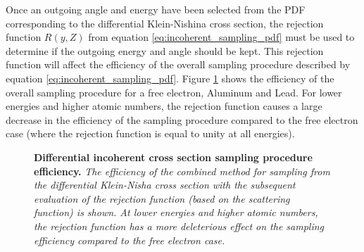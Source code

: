 Once an outgoing angle and energy have been selected from the PDF corresponding
to the differential Klein-Nishina cross section, the rejection function 
$R(y,Z)$ from equation \ref{eq:incoherent_sampling_pdf} must be used to 
determine if the outgoing energy and angle should be kept. This rejection 
function will affect the efficiency of the overall sampling procedure 
described by equation \ref{eq:incoherent_sampling_pdf}. Figure 
\ref{fig:diff_incoh_sampling_proc_eff} shows the efficiency of the overall 
sampling procedure for a free electron, Aluminum and Lead. For lower energies 
and higher atomic numbers, the rejection function causes a large decrease in 
the efficiency of the sampling procedure compared to the free electron case 
(where the rejection function is equal to unity at all energies).
\begin{figure}[t!]
  \begin{center}
  \end{center}
  \caption{\textbf{Differential incoherent cross section sampling procedure efficiency.}
    \textit{The efficiency of the combined method for sampling from the 
      differential Klein-Nisha cross section with the subsequent evaluation of 
      the rejection function (based on the scattering function) is shown. At
      lower energies and higher atomic numbers, the rejection function has
      a more deleterious effect on the sampling efficiency compared to the 
      free electron case.}}
  \label{fig:diff_incoh_sampling_proc_eff}
\end{figure}


